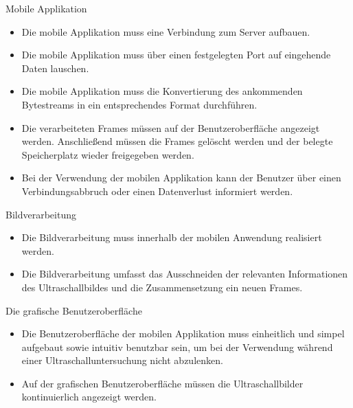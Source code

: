\begin{minipage}{\textwidth}
Mobile Applikation
\begin{itemize}
\item Die mobile Applikation muss eine Verbindung zum Server aufbauen.
\item Die mobile Applikation muss über einen festgelegten Port auf eingehende Daten lauschen.
\item Die mobile Applikation muss die Konvertierung des ankommenden Bytestreams in ein entsprechendes Format durchführen.
\item Die verarbeiteten Frames müssen auf der Benutzeroberfläche angezeigt werden. Anschließend müssen die Frames gelöscht werden und der belegte Speicherplatz wieder freigegeben werden. 
\item Bei der Verwendung der mobilen Applikation kann der Benutzer über einen Verbindungsabbruch oder einen Datenverlust informiert werden.
\end{itemize}
\end{minipage}

\begin{minipage}{\textwidth}
Bildverarbeitung
\begin{itemize}
\item Die Bildverarbeitung muss innerhalb der mobilen Anwendung realisiert werden.
\item Die Bildverarbeitung umfasst das Ausschneiden der relevanten Informationen des Ultraschallbildes und die Zusammensetzung ein neuen Frames.
\end{itemize}
\end{minipage}

\begin{minipage}{\textwidth}
Die grafische Benutzeroberfläche
\begin{itemize}
\item Die Benutzeroberfläche der mobilen Applikation muss einheitlich und simpel aufgebaut sowie intuitiv benutzbar sein, um bei der Verwendung während einer Ultraschalluntersuchung nicht abzulenken.
\item Auf der grafischen Benutzeroberfläche müssen die Ultraschallbilder kontinuierlich angezeigt werden.
\end{itemize}
\end{minipage}
